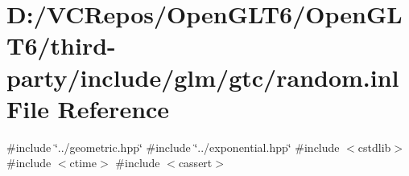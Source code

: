 \hypertarget{random_8inl}{}\section{D\+:/\+V\+C\+Repos/\+Open\+G\+L\+T6/\+Open\+G\+L\+T6/third-\/party/include/glm/gtc/random.inl File Reference}
\label{random_8inl}
{\ttfamily \#include \char`\"{}../geometric.\+hpp\char`\"{}}\newline
{\ttfamily \#include \char`\"{}../exponential.\+hpp\char`\"{}}\newline
{\ttfamily \#include $<$cstdlib$>$}\newline
{\ttfamily \#include $<$ctime$>$}\newline
{\ttfamily \#include $<$cassert$>$}\newline
